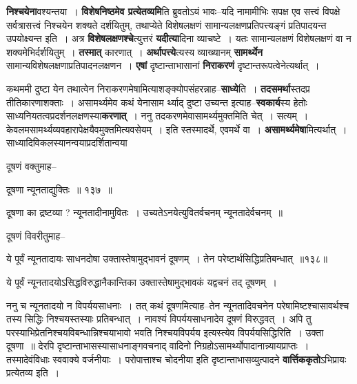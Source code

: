 \documentclass[article,12pt,a4paper]{memoir}
\begin{document}
	  \pstart \textbf{निश्चयेना}वश्यन्तया । \textbf{विशेषनिष्ठमेव प्रत्येतव्यमि}ति ब्रुवतोऽयं भावः--यदि नामामीभिः सपक्ष एव सत्त्वं विपक्षे सर्वत्रासत्त्वं निश्चयेन शक्यते दर्शयितुम्, तथाप्येते विशेषलक्षणं सामान्यलक्षणप्रतिपत्त्यङ्गं प्रतिपादयन्त उपयोक्ष्यन्त इति । अत्र \textbf{विशेषलक्षणश्चे}त्युत्तरं \textbf{यदीत्या}दिना व्याचष्टे । यतः सामान्यलक्षणं विशेषलक्षणं वा न शक्यमेभिर्दर्शयितुम् । \textbf{तस्मात्} कारणात् । \textbf{अर्थापत्त्ये}त्यस्य व्याख्यानम् \textbf{सामर्थ्येन} सामान्यविशेषलक्षणाप्रतिपादनलक्षणन । \textbf{एषां} दृष्टान्ताभासानां \textbf{निराकरणं} दृष्टान्तरूपत्वेनेत्यर्थात् ।
	\pend
      

	  \pstart कथममी दुष्टा येन तथात्वेन निराकरणमेषामित्याशङ्क्योपसंहरन्नाह--\textbf{साध्ये}ति । \textbf{तदसमर्था}स्तदप्र  तीतिकारणाशक्ताः । असामर्थ्यमेव कथं येनासाम \leavevmode{}र्थ्याद् दुष्टा उच्यन्त इत्याह--\textbf{स्वकार्य}स्य हेतोः साध्यनियतत्वप्रदर्शनलक्षणस्या\textbf{करणात्} । ननु तदकरणमेवासामर्थ्यमुक्तमिति चेत् । सत्यम् । केवलमसामर्थ्यव्यवहारापेक्षयैवमुक्तमित्यवसेयम् । इति स्तस्मादर्थे, एवमर्थे वा । \textbf{असामर्थ्यमेषा}मित्यर्थात् । साध्यादिविकलस्यानन्वयाप्रदर्शितान्वया    \leavevmode{} 
	  
	दूषणं वक्तुमाह--  
	  
	दूषणा न्यूनताद्युक्तिः ॥ १३७ ॥ 
	  
	दूषणा का द्रष्टव्या ? न्यूनतादीनामुवितः । उच्यतेऽनयेत्युवितर्वचनम् न्यूनतादेर्वचनम् ॥  
	  
	दूषणं विवरीतुमाह--  
	  
	ये पूर्वं न्यूनतादायः साधनदोषा उक्तास्तेषामुद्भावनं दूषणम् । तेन परेष्टार्थसिद्धिप्रतिबन्धात् ॥१३८॥ 
	  
	ये पूर्वं न्यूनतादयोऽसिद्धविरुद्धानैकान्तिका उक्तास्तेषामुद्भावकं यद्वचनं तद् दूषणम् ।  
	  
	ननु च न्यूनतादयो न विपर्ययसाधनाः । तत् कथं दूषणमित्याह--तेन न्यूनतादिवचनेन परेषामिष्टश्चासावर्थश्च तस्य सिद्धिः निश्चयस्तस्याः प्रतिबन्धात् । नावश्यं विपर्ययसाधनादेव दूषणं विरुद्धवत् । अपि तु परस्याभिप्रेतनिश्चयविबन्धान्निश्चयाभावो भवति निश्चयविपर्यय इत्यस्त्येव विपर्ययसिद्धिरिति । उक्ता दूषणा ॥ देरपि दृष्टान्ताभासस्यासाधनाङ्गवचनाद् वादिनो निग्रहोऽसामर्थ्योपादानान्न्यायप्राप्तः । तस्मादेवंविधाः स्ववाक्ये वर्जनीयाः । परोपात्ताश्च चोदनीया इति दृष्टान्ताभासव्युत्पादने \textbf{वार्त्तिककृतो}ऽभिप्रायः प्रत्येतव्य इति ।
	\pend
      
\end{document}
